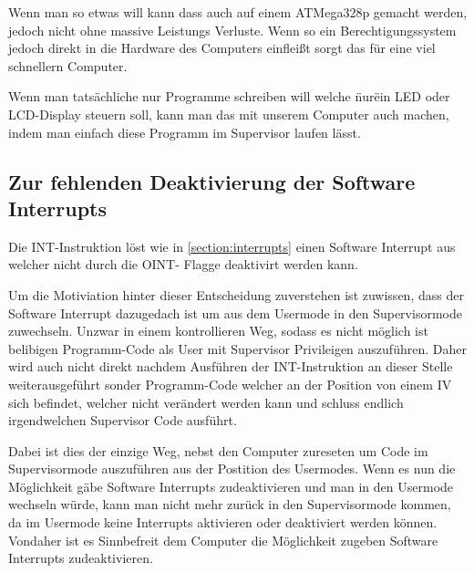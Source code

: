 \documentclass{scrartcl}
\begin{document}
Wenn man so etwas will kann dass auch auf einem ATMega328p gemacht werden, jedoch nicht ohne massive Leistungs Verluste. Wenn so ein Berechtigungssystem jedoch direkt in die Hardware des Computers einfleißt sorgt das für eine viel schnellern Computer. 

Wenn man tatsächliche nur Programme schreiben will welche \"nur\" ein LED oder LCD-Display steuern soll, kann man das mit unserem Computer auch machen, indem man einfach diese Programm im Supervisor laufen lässt.

\subsection{\label{com:SoftwareInterrupt}Zur fehlenden Deaktivierung der Software Interrupts}

Die INT-Instruktion löst wie in \autoref{section:interrupts} einen Software Interrupt aus welcher nicht durch die OINT- Flagge deaktivirt werden kann. 

Um die Motiviation hinter dieser Entscheidung zuverstehen ist zuwissen, dass der Software Interrupt dazugedach ist um aus dem Usermode in den Supervisormode zuwechseln. Unzwar in einem kontrollieren Weg, sodass es nicht möglich ist belibigen Programm-Code als User mit Supervisor Privileigen auszuführen. Daher wird auch nicht direkt nachdem Ausführen der INT-Instruktion an dieser Stelle weiterausgeführt sonder Programm-Code welcher an der Position von einem IV sich befindet, welcher nicht verändert werden kann und schluss endlich irgendwelchen Supervisor Code ausführt. 

Dabei ist dies der einzige Weg, nebst den Computer zureseten um Code im Supervisormode auszuführen aus der Postition des Usermodes. Wenn es nun die Möglichkeit gäbe Software Interrupts zudeaktivieren und man in den Usermode wechseln würde, kann man nicht mehr zurück in den Supervisormode kommen, da im Usermode keine Interrupts aktivieren oder deaktiviert werden können. Vondaher ist es Sinnbefreit dem Computer die Möglichkeit zugeben Software Interrupts zudeaktivieren.

\printbibliography{}
\end{document}
